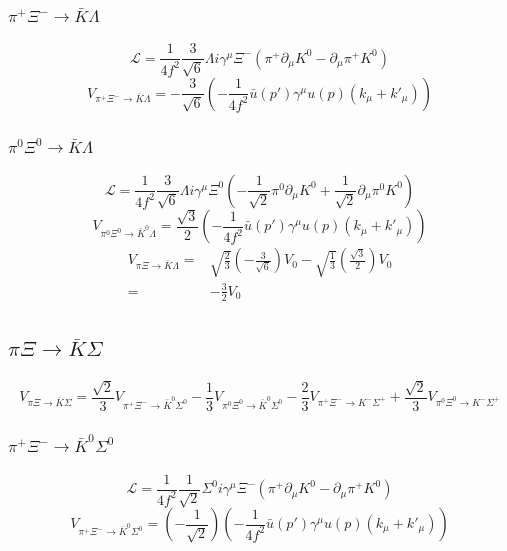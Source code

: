 \subsubsection{$\pi^{+}\Xi^{-}\to \bar{K}\Lambda$}
\begin{equation}
	\mathcal{L}=\frac{1}{4f^2}\frac{3}{\sqrt{6}}\Lambda i\gamma^{\mu}\Xi^{-}(\pi^{+}\partial_{\mu}K^{0}-\partial_{\mu}\pi^{+}K^{0})
\end{equation}
\begin{equation}
V_{\pi^{+}\Xi^{-}\to \bar{K}\Lambda}=-\frac{3}{\sqrt{6}}\left(-\frac{1}{4f^2}\bar{u}(p')\gamma^{\mu}u(p)(k_{\mu}+k'_{\mu})\right)
\end{equation}
\subsubsection{$\pi^{0}\Xi^{0}\to \bar{K}\Lambda$}
\begin{equation}
	\mathcal{L}=\frac{1}{4f^2}\frac{3}{\sqrt{6}}\Lambda i\gamma^{\mu}\Xi^{0}(-\frac{1}{\sqrt{2}}\pi^{0}\partial_{\mu}K^{0}+\frac{1}{\sqrt{2}}\partial_{\mu}\pi^{0}K^{0})
\end{equation}
\begin{equation}
	V_{\pi^{0}\Xi^{0}\rightarrow \bar{K}^{0}\Lambda}=\frac{\sqrt{3}}{2}\left(-\frac{1}{4f^2}\bar{u}(p')\gamma^{\mu}u(p)(k_{\mu}+k'_{\mu})\right)
\end{equation}
\begin{equation}
\begin{split}
	V_{\pi\Xi\rightarrow \bar{K}\Lambda}=&\sqrt{\frac{2}{3}}(-\frac{3}{\sqrt{6}})V_{0}-\sqrt{\frac{1}{3}}(\frac{\sqrt{3}}{2})V_{0}\\
	=&-\frac{3}{2}V_{0}
\end{split}
\end{equation}
\subsection{$\pi\Xi\rightarrow \bar{K}\Sigma$}
\begin{equation}
	V_{\pi\Xi\rightarrow \bar{K}\Sigma}=\frac{\sqrt{2}}{3}V_{\pi^{+}\Xi^{-}\rightarrow \bar{K}^{0}\Sigma^{0}}-\frac{1}{3}V_{\pi^{0}\Xi^{0}\rightarrow \bar{K}^{0}\Sigma^{0}}-\frac{2}{3}V_{\pi^{+}\Xi^{-}\rightarrow K^{-}\Sigma^{+}}+\frac{\sqrt{2}}{3}V_{\pi^{0}\Xi^{0}\rightarrow K^{-}\Sigma^{+}}
\end{equation}
\subsubsection{$\pi^{+}\Xi^{-}\to \bar{K}^{0}\Sigma^{0}$}
\begin{equation}
	\mathcal{L}=\frac{1}{4f^2}\frac{1}{\sqrt{2}}\Sigma^{0}i\gamma^{\mu}\Xi^{-}(\pi^{+}\partial_{\mu}K^{0}-\partial_{\mu}\pi^{+}K^{0})
\end{equation}
\begin{equation}
	V_{\pi^{+}\Xi^{-}\rightarrow \bar{K}^{0}\Sigma^{0}}=\left(-\frac{1}{\sqrt{2}}\right)\left(-\frac{1}{4f^2}\bar{u}(p')\gamma^{\mu}u(p)(k_{\mu}+k'_{\mu})\right)
\end{equation}

